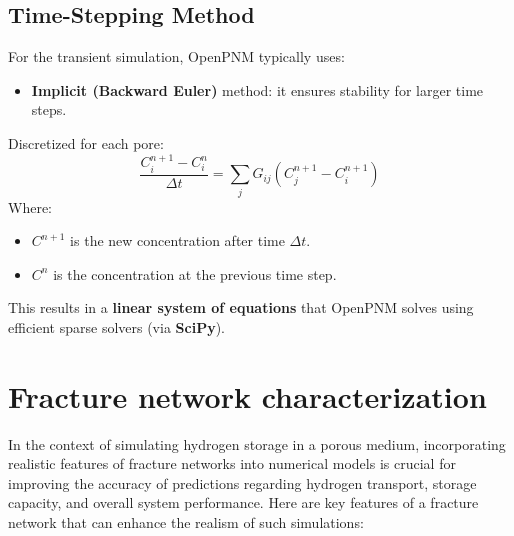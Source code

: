 \documentclass{article}
\begin{document}
\subsection{Time-Stepping Method}
For the transient simulation, OpenPNM typically uses:
\begin{itemize}
    \item \textbf{Implicit (Backward Euler)} method: it ensures stability for larger time steps.
\end{itemize}
Discretized for each pore:
\begin{equation}
    \frac{C_i^{n+1} - C_i^n}{\Delta t} = \sum_j G_{ij} (C_j^{n+1} - C_i^{n+1})
\end{equation}
Where:
\begin{itemize}
    \item $C^{n+1}$ is the new concentration after time $\Delta t$.
    \item $C^n$ is the concentration at the previous time step.
\end{itemize}
This results in a \textbf{linear system of equations} that OpenPNM solves using efficient sparse solvers (via \textbf{SciPy}).

\section{Fracture network characterization}
In the context of simulating hydrogen storage in a porous medium, incorporating realistic features of fracture networks into numerical models is crucial for improving the accuracy of predictions regarding hydrogen transport, storage capacity, and overall system performance. Here are key features of a fracture network that can enhance the realism of such simulations:
\end{document}
